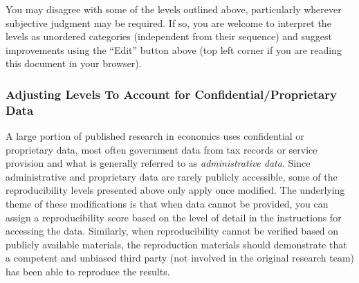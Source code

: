 \documentclass[
]{book}
\begin{document}
You may disagree with some of the levels outlined above, particularly wherever subjective judgment may be required. If so, you are welcome to interpret the levels as unordered categories (independent from their sequence) and suggest improvements using the ``Edit'' button above (top left corner if you are reading this document in your browser).

\hypertarget{adjusting-levels-to-account-for-confidentialproprietary-data}{%
\subsubsection*{Adjusting Levels To Account for Confidential/Proprietary Data}\label{adjusting-levels-to-account-for-confidentialproprietary-data}}

A large portion of published research in economics uses confidential or proprietary data, most often government data from tax records or service provision and what is generally referred to as \emph{administrative data}. Since administrative and proprietary data are rarely publicly accessible, some of the reproducibility levels presented above only apply once modified. The underlying theme of these modifications is that when data cannot be provided, you can assign a reproducibility score based on the level of detail in the instructions for accessing the data. Similarly, when reproducibility cannot be verified based on publicly available materials, the reproduction materials should demonstrate that a competent and unbiased third party (not involved in the original research team) has been able to reproduce the results.
\end{document}
